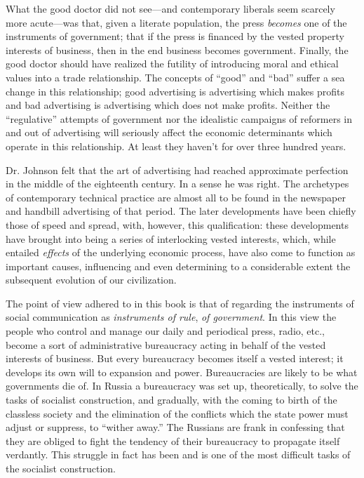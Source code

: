 \documentclass[twoside,nohyper,openany,nobib]{tufte-book}
\begin{document}
What the good doctor did not see---and contemporary liberals seem
scarcely more acute---was that, given a literate population, the press
\emph{becomes} one of the instruments of government; that if the press
is financed by the vested property interests of business, then in the
end business becomes government. Finally, the good doctor should have
realized the futility of introducing moral and ethical values into a
trade relationship. The concepts of ``good'' and ``bad'' suffer a sea
change in this relationship; good advertising is advertising which makes
profits and bad advertising is advertising which does not make profits.
Neither the ``regulative'' attempts of government nor the idealistic
campaigns of reformers in and out of advertising will seriously affect
the economic determinants which operate in this relationship. At least
they haven't for over three hundred years.

Dr. Johnson felt that the art of advertising had reached approximate
perfection in the middle of the eighteenth century. In a sense he was
right. The archetypes of contemporary technical practice are almost all
to be found in the newspaper and handbill advertising of that period.
The later developments have been chiefly those of speed and spread,
with, however, this qualification: these developments have brought into
being a series of interlocking vested interests, which, while entailed
\emph{effects} of the underlying economic process, have also come to
function as important causes, influencing and even determining to a
considerable extent the subsequent evolution of our civilization.

The point of view adhered to in this book is that of regarding the
instruments of social communication as \emph{instruments of rule},
\emph{of government}. In this view the people who control and manage our
daily and periodical press, radio, etc., become a sort of administrative
bureaucracy acting in behalf of the vested interests of business. But
every bureaucracy becomes itself a vested interest; it develops its own
will to expansion and power. Bureaucracies are likely to be what
governments die of. In Russia a bureaucracy was set up, theoretically,
to solve the tasks of socialist construction, and gradually, with the
coming to birth of the classless society and the elimination of the
conflicts which the state power must adjust or suppress, to ``wither
away.'' The Russians are frank in confessing that they are obliged to
fight the tendency of their bureaucracy to propagate itself verdantly.
This struggle in fact has been and is one of the most difficult tasks of
the socialist construction.
\end{document}
